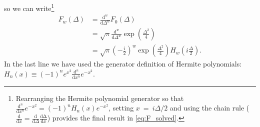 \documentclass[aip, jcp, reprint, onecolumn, nofootinbib]{revtex4-2}
\begin{document}
so we can write\footnote{
	Rearranging the Hermite polynomial generator so that $\frac{\mathrm{d}^n}{\mathrm{d}x^n} e^{-x^2} = (-1)^n H_n(x) e^{-x^2}$, setting $x \ = \ i \Delta /2$ and using the chain rule ($\frac{\mathrm{d}}{\mathrm{d}x} =  \frac{\mathrm{d}}{\mathrm{d}\Delta}  \frac{\mathrm{d\Delta}}{\mathrm{d}x}$) provides the final result in \autoref{eq:F_solved}.
	}
\begin{equation}\label{eq:F_solved}
	\begin{split}
		F_w(\Delta) &= \frac{\mathrm{d}^w}{\mathrm{d}\Delta^w} F_0(\Delta) \\
		&= \sqrt{\pi} \frac{\mathrm{d}^w}{\mathrm{d}\Delta^w} \exp(\frac{\Delta^2}{4}) \\
		&= \sqrt{\pi} \left( -\frac{i}{2} \right)^w \exp(\frac{\Delta^2}{4}) H_w\left(i\frac{\Delta}{2}\right).
	\end{split}
\end{equation}
In the last line we have used the generator definition of Hermite polynomials:  $H_n(x) \equiv (-1)^n e^{x^2} \frac{\mathrm{d}^n}{\mathrm{d}x^n} e^{-x^2}$.\cite{MorseFeshbach}
\vspace{3pt}
\end{document}
